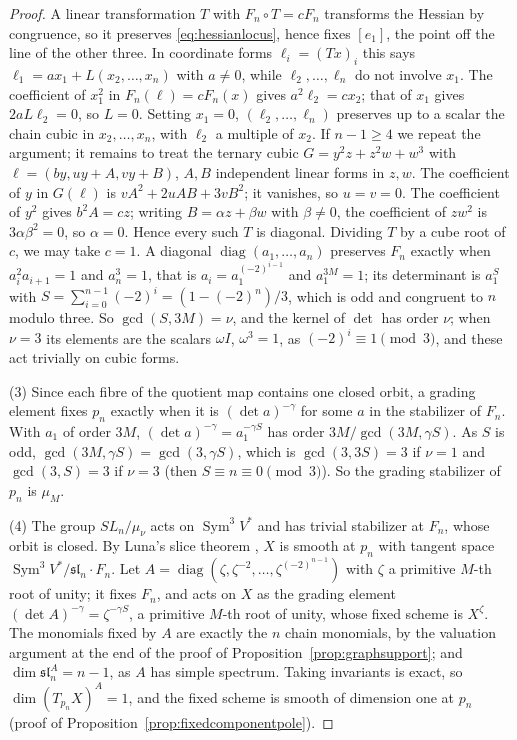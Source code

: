 \documentclass[11pt,a4paper]{article}
\theoremstyle{definition}
\newcommand{\Sym}{\operatorname{Sym}}
\newcommand{\diag}{\operatorname{diag}}
\begin{document}
\begin{proof}
A linear transformation $T$ with $F_n\circ T=cF_n$ transforms the Hessian by
congruence, so it preserves \eqref{eq:hessianlocus}, hence fixes $[e_1]$, the
point off the line of the other three. In coordinate forms $\ell_i=(Tx)_i$
this says $\ell_1=ax_1+L(x_2,\dots,x_n)$ with $a\ne0$, while $\ell_2,\dots,
\ell_n$ do not involve $x_1$. The coefficient of $x_1^2$ in
$F_n(\ell)=cF_n(x)$ gives $a^2\ell_2=cx_2$; that of $x_1$ gives $2aL\ell_2=0$,
so $L=0$. Setting $x_1=0$, $(\ell_2,\dots,\ell_n)$ preserves up to a scalar the
chain cubic in $x_2,\dots,x_n$, with $\ell_2$ a multiple of $x_2$. If $n-1\ge4$
we repeat the argument; it remains to treat the ternary cubic
$G=y^2z+z^2w+w^3$ with $\ell=(by,uy+A,vy+B)$, $A,B$ independent linear forms
in $z,w$. The coefficient of $y$ in $G(\ell)$ is $vA^2+2uAB+3vB^2$; it
vanishes, so $u=v=0$. The coefficient of $y^2$ gives $b^2A=cz$; writing
$B=\alpha z+\beta w$ with $\beta\ne0$, the coefficient of $zw^2$ is
$3\alpha\beta^2=0$, so $\alpha=0$. Hence every such $T$ is diagonal. Dividing $T$ by a cube root of $c$, we may
take $c=1$. A diagonal $\diag(a_1,\dots,a_n)$ preserves $F_n$ exactly when $a_i^2a_{i+1}=1$
and $a_n^3=1$, that is $a_i=a_1^{(-2)^{i-1}}$ and $a_1^{3M}=1$; its
determinant is $a_1^S$ with $S=\sum_{i=0}^{n-1}(-2)^i=(1-(-2)^n)/3$, which is
odd and congruent to $n$ modulo three. So $\gcd(S,3M)=\nu$, and the kernel of
$\det$ has order $\nu$; when $\nu=3$ its elements are the scalars
$\omega I$, $\omega^3=1$, as $(-2)^i\equiv1\pmod3$, and these act trivially on
cubic forms.

(3) Since each fibre of the quotient map contains one closed orbit, a grading
element fixes $p_n$ exactly when it is $(\det a)^{-\gamma}$ for some $a$ in the
stabilizer of $F_n$. With $a_1$ of order $3M$, $(\det a)^{-\gamma}=
a_1^{-\gamma S}$ has order $3M/\gcd(3M,\gamma S)$. As $S$ is odd,
$\gcd(3M,\gamma S)=\gcd(3,\gamma S)$, which is $\gcd(3,3S)=3$ if $\nu=1$ and
$\gcd(3,S)=3$ if $\nu=3$ (then $S\equiv n\equiv0\pmod3$). So the grading
stabilizer of $p_n$ is $\mu_M$.

(4) The group $SL_n/\mu_\nu$ acts on $\Sym^3V^*$ and has trivial stabilizer at
$F_n$, whose orbit is closed. By Luna's slice theorem \cite[Section III.1,
Th\'eor\`eme du slice \'etale and Remarque 1$^\circ$, pp.~97--98]{Luna}, $X$ is smooth at $p_n$ with tangent space
$\Sym^3V^*/\mathfrak{sl}_n\cdot F_n$. Let $A=\diag(\zeta,\zeta^{-2},\dots,
\zeta^{(-2)^{n-1}})$ with $\zeta$ a primitive $M$-th root of unity; it fixes
$F_n$, and acts on $X$ as the grading element $(\det A)^{-\gamma}=\zeta^{-\gamma
S}$, a primitive $M$-th root of unity, whose fixed scheme is $X^\zeta$. The
monomials fixed by $A$ are exactly the $n$ chain monomials, by the valuation
argument at the end of the proof of Proposition~\ref{prop:graphsupport}; and
$\dim\mathfrak{sl}_n^A=n-1$, as $A$ has simple spectrum. Taking invariants is
exact, so $\dim(T_{p_n}X)^A=1$, and the fixed scheme is smooth of dimension one
at $p_n$ (proof of Proposition~\ref{prop:fixedcomponentpole}).
\end{proof}
\end{document}
